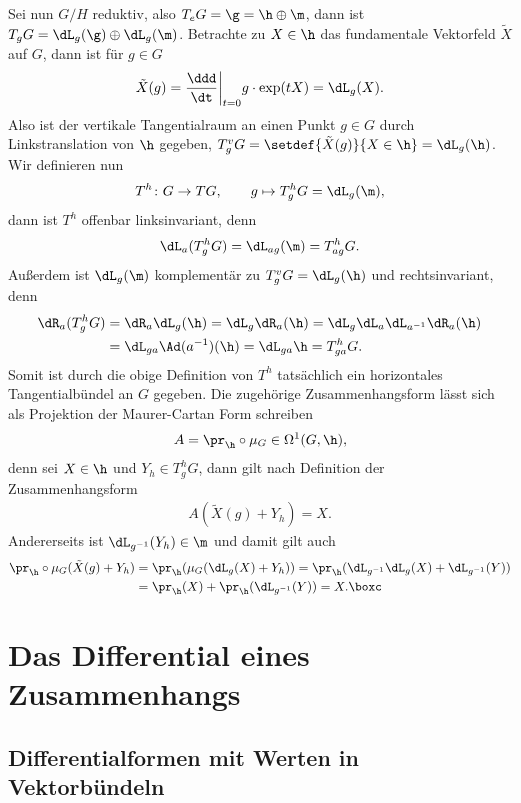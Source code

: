 \documentclass[%
	paper=a5,%
	fleqn,%
	DIV=18,%
	BCOR=0mm,
	fontsize=11pt,
	titlepage=false,%
	bibliography=totoc,
	DIV=18,%
	twoside=true,
	pdftitle=Riemannsche Geometrie,
	pdfauthor=Uwe Semmelmann,
	numbers=noendperiod]%
	{scrbook}
\begin{document}
\begin{ex}
Sei nun $G/H$ reduktiv, also $T_eG = \g = \h\oplus \m$, dann ist $T_gG =
\dL_g(\g)\oplus \dL_g(\m)$.
Betrachte zu $X\in\h$ das fundamentale Vektorfeld $\tilde{X}$ auf $G$, dann ist
für $g\in G$
\begin{align*}
\tilde{X}(g) = \frac{\ddd}{\dt}\bigg|_{t=0} g\cdot \exp(tX)
= \dL_g(X).
\end{align*}
Also ist der vertikale Tangentialraum an einen Punkt $g\in G$ durch
Linkstranslation von $\h$ gegeben, $T^v_g G = \setdef{\tilde{X}(g)}{X\in \h} =
\dL_g(\h)$. Wir definieren nun
\begin{align*}
T^h \colon G\to TG,\qquad g\mapsto T_g^hG = \dL_g(\m), 
\end{align*}
dann ist $T^h$ offenbar linksinvariant, denn
\begin{align*}
\dL_a(T^h_gG) = \dL_{ag}(\m) = T_{ag}^hG.
\end{align*}
Außerdem ist $\dL_g(\m)$ komplementär zu $T_g^vG = \dL_g(\h)$ und
rechtsinvariant, denn
\begin{align*}
\dR_a(T_g^hG) &= \dR_a\dL_g(\h) = 
\dL_g\dR_a(\h) = 
\dL_g\dL_a \dL_{a^{-1}}\dR_a(\h)\\
&= \dL_{ga}\Ad(a^{-1})(\h)
=   \dL_{ga}\h = T_{ga}^h G.
\end{align*}
Somit ist durch die obige Definition von $T^h$ tatsächlich ein horizontales
Tangentialbündel an $G$ gegeben. Die zugehörige Zusammenhangsform lässt sich als
Projektion der Maurer-Cartan Form schreiben
\begin{align*}
A = \pr_{\h}\circ\mu_G \in\Omega^1(G,\h),
\end{align*} 
denn sei $X\in\h$ und $Y_h\in T_g^h G$, dann gilt nach Definition der
Zusammenhangsform
\begin{align*}
A(\tilde{X}(g) + Y_h) = X.
\end{align*}
Andererseits ist $\dL_{g^{-1}}(Y_h) \in \m$ und damit gilt auch
\begin{align*}
\pr_{\h}\circ \mu_G(\tilde{X}(g) + Y_h) &= 
\pr_{\h}(\mu_G(\dL_g(X)+Y_h))
= \pr_{\h}(\dL_{g^{-1}}\dL_g(X) + \dL_{g^{-1}}(Y))\\
&= \pr_{\h}(X) + \pr_{\h}(\dL_{g^{-1}}(Y))
= X.\boxc
\end{align*}
\end{ex}

\chapter{Das Differential eines Zusammenhangs}

\section{Differentialformen mit Werten in Vektorbündeln}
\end{document}
